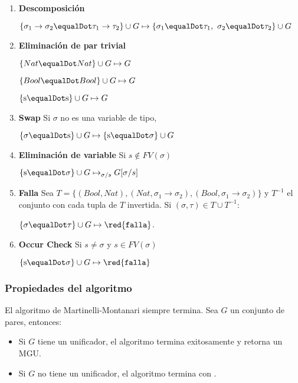 \begin{enumerate}
	\item \textbf{Descomposición}
	
	$\{\sigma_1\to\sigma_2 \equalDot\tau_1\to\tau_2\}\cup G\mapsto \{\sigma_1\equalDot\tau_1,~\sigma_2 \equalDot\tau_2\}\cup G$
	\item \textbf{Eliminación de par trivial}
	
	$\{Nat \equalDot Nat\}\cup G\mapsto G$
	
	$\{ Bool \equalDot Bool\}\cup G\mapsto G$
	
	$\{\text{s} \equalDot\text{s}\}\cup G\mapsto G$
	\item \textbf{Swap} Si $\sigma$ no es una variable de tipo,
	
	$\{\sigma \equalDot\text{s}\}\cup G\mapsto \{\text{s}\equalDot\sigma\}\cup G$
	
	\item \textbf{Eliminación de variable} Si $s\notin FV(\sigma)$
	
	$\{\text{s}\equalDot\sigma\}\cup G\mapsto_{\sigma/s} G[\sigma/s]$
	
	\item \textbf{Falla} Sea $T =\{( Bool,Nat), (Nat, \sigma_1\to\sigma_2), ( Bool, \sigma_1\to\sigma_2)\}$ y $T^{-1}$ el conjunto con cada tupla de $T$ invertida. Si $(\sigma,\tau)\in T\cup T^{-1}$:
	
	$\{\sigma\equalDot\tau\}\cup G\mapsto \red{\texttt{falla}}$.
	
	\item \textbf{Occur Check} Si $s\neq\sigma$ y $s\in FV(\sigma)$
	
	$\{\text{s}\equalDot\sigma\}\cup G\mapsto \red{\texttt{falla}}$
\end{enumerate}

\subsubsection{Propiedades del algoritmo}
El algoritmo de Martinelli-Montanari siempre termina. Sea $G$ un conjunto de pares, entonces:
\begin{itemize}
	\item Si $G$ tiene un unificador, el algoritmo termina exitosamente y retorna un MGU.
	\item Si $G$ no tiene un unificador, el algoritmo termina con .
\end{itemize}


